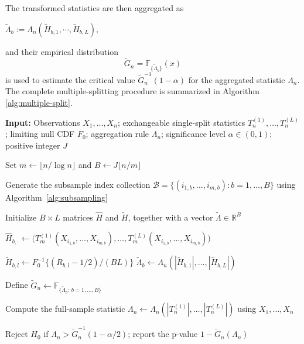 \documentclass[12pt,reqno,oneside]{amsbook}
\theoremstyle{definition}
\theoremstyle{remark}
\begin{document}
The transformed statistics are then aggregated as
\begin{center}
    $\tilde{\Lambda}_{b}:= \Lambda_n(\tilde{H}_{b,1},\cdots,\tilde{H}_{b,L}),$
\end{center}
and their empirical distribution
\[
\tilde{G}_n
=
\mathbb{F}_{\{\tilde{\Lambda}_b\}}(x)
\]
is used to estimate the critical value
$\tilde{G}_n^{-1}(1-\alpha)$
for the aggregated statistic $\Lambda_n$. The complete multiple-splitting procedure is summarized in Algorithm \ref{alg:multiple-split}.

\begin{algorithm}[htbp!]
\caption{Rank-transformed aggregated multiple-split test}
\label{alg:multiple-split}

\begin{algorithmic}[1]
\State \textbf{Input:} Observations $X_1,\ldots,X_n$; exchangeable single-split statistics $T_n^{(1)},\ldots,T_n^{(L)}$; limiting null CDF $F_0$; aggregation rule $\Lambda_n$; significance level $\alpha\in(0,1)$; positive integer $J$

\State Set $m\gets \lfloor n/\log n\rfloor$ and $B\gets J\lfloor n/m\rfloor$

\State Generate the subsample index collection
$\mathcal{B}=\{(i_{1,b},\ldots,i_{m,b}): b=1,\ldots,B\}$
using Algorithm~\ref{alg:subsampling}

\State Initialize $B\times L$ matrices $\widehat{H}$ and $\widetilde{H}$, together with a vector $\widetilde{\Lambda}\in\mathbb{R}^{B}$

    \State $\widehat{H}_{b,\cdot}\gets
    \big(T_m^{(1)}(X_{i_{1,b}},\ldots,X_{i_{m,b}}),\ldots,
    T_m^{(L)}(X_{i_{1,b}},\ldots,X_{i_{m,b}})\big)$
\EndFor

        \State $\widetilde{H}_{b,l}\gets F_0^{-1}\{(R_{b,l}-1/2)/(BL)\}$
    \EndFor
    \State $\widetilde{\Lambda}_b\gets
    \Lambda_n(|\widetilde{H}_{b,1}|,\ldots,|\widetilde{H}_{b,L}|)$
\EndFor

\State Define $\widetilde{G}_n\gets \mathbb{F}_{\{\widetilde{\Lambda}_b:\,b=1,\ldots,B\}}$

\State Compute the full-sample statistic
$\Lambda_n\gets \Lambda_n(|T_n^{(1)}|,\ldots,|T_n^{(L)}|)$
using $X_1,\ldots,X_n$

\State Reject $H_0$ if
$\Lambda_n>\widetilde{G}_n^{-1}(1-\alpha/2)$;
report the p-value $1-\widetilde{G}_n(\Lambda_n)$

\end{algorithmic}
\end{algorithm}
\end{document}
